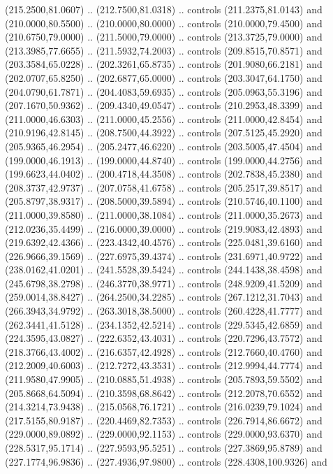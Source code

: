   (215.2500,81.0607) .. (212.7500,81.0318) .. controls (211.2375,81.0143) and
  (210.0000,80.5500) .. (210.0000,80.0000) .. controls (210.0000,79.4500) and
  (210.6750,79.0000) .. (211.5000,79.0000) .. controls (213.3725,79.0000) and
  (213.3985,77.6655) .. (211.5932,74.2003) .. controls (209.8515,70.8571) and
  (203.3584,65.0228) .. (202.3261,65.8735) .. controls (201.9080,66.2181) and
  (202.0707,65.8250) .. (202.6877,65.0000) .. controls (203.3047,64.1750) and
  (204.0790,61.7871) .. (204.4083,59.6935) .. controls (205.0963,55.3196) and
  (207.1670,50.9362) .. (209.4340,49.0547) .. controls (210.2953,48.3399) and
  (211.0000,46.6303) .. (211.0000,45.2556) .. controls (211.0000,42.8454) and
  (210.9196,42.8145) .. (208.7500,44.3922) .. controls (207.5125,45.2920) and
  (205.9365,46.2954) .. (205.2477,46.6220) .. controls (203.5005,47.4504) and
  (199.0000,46.1913) .. (199.0000,44.8740) .. controls (199.0000,44.2756) and
  (199.6623,44.0402) .. (200.4718,44.3508) .. controls (202.7838,45.2380) and
  (208.3737,42.9737) .. (207.0758,41.6758) .. controls (205.2517,39.8517) and
  (205.8797,38.9317) .. (208.5000,39.5894) .. controls (210.5746,40.1100) and
  (211.0000,39.8580) .. (211.0000,38.1084) .. controls (211.0000,35.2673) and
  (212.0236,35.4499) .. (216.0000,39.0000) .. controls (219.9083,42.4893) and
  (219.6392,42.4366) .. (223.4342,40.4576) .. controls (225.0481,39.6160) and
  (226.9666,39.1569) .. (227.6975,39.4374) .. controls (231.6971,40.9722) and
  (238.0162,41.0201) .. (241.5528,39.5424) .. controls (244.1438,38.4598) and
  (245.6798,38.2798) .. (246.3770,38.9771) .. controls (248.9209,41.5209) and
  (259.0014,38.8427) .. (264.2500,34.2285) .. controls (267.1212,31.7043) and
  (266.3943,34.9792) .. (263.3018,38.5000) .. controls (260.4228,41.7777) and
  (262.3441,41.5128) .. (234.1352,42.5214) .. controls (229.5345,42.6859) and
  (224.3595,43.0827) .. (222.6352,43.4031) .. controls (220.7296,43.7572) and
  (218.3766,43.4002) .. (216.6357,42.4928) .. controls (212.7660,40.4760) and
  (212.2009,40.6003) .. (212.7272,43.3531) .. controls (212.9994,44.7774) and
  (211.9580,47.9905) .. (210.0885,51.4938) .. controls (205.7893,59.5502) and
  (205.8668,64.5094) .. (210.3598,68.8642) .. controls (212.2078,70.6552) and
  (214.3214,73.9438) .. (215.0568,76.1721) .. controls (216.0239,79.1024) and
  (217.5155,80.9187) .. (220.4469,82.7353) .. controls (226.7914,86.6672) and
  (229.0000,89.0892) .. (229.0000,92.1153) .. controls (229.0000,93.6370) and
  (228.5317,95.1714) .. (227.9593,95.5251) .. controls (227.3869,95.8789) and
  (227.1774,96.9836) .. (227.4936,97.9800) .. controls (228.4308,100.9326) and
